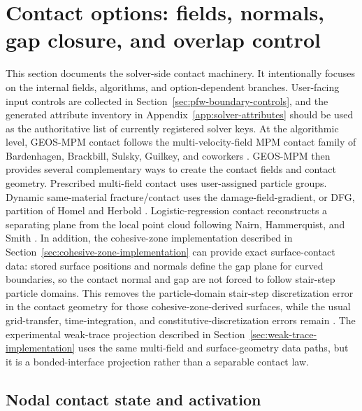 \section{Contact options: fields, normals, gap closure, and overlap control}
\label{sec:contact-surface-detection-spacing}
\label{sec:contact-options}

This section documents the solver-side contact machinery.  It intentionally focuses on the internal fields, algorithms, and option-dependent branches.  User-facing input controls are collected in Section~\ref{sec:pfw-boundary-controls}, and the generated attribute inventory in Appendix~\ref{app:solver-attributes} should be used as the authoritative list of currently registered solver keys.  At the algorithmic level, GEOS-MPM contact follows the multi-velocity-field MPM contact family of Bardenhagen, Brackbill, Sulsky, Guilkey, and coworkers \cite{bardenhagen2000granular,bardenhagen2001contact}.  GEOS-MPM then provides several complementary ways to create the contact fields and contact geometry.  Prescribed multi-field contact uses user-assigned particle groups.  Dynamic same-material fracture/contact uses the damage-field-gradient, or DFG, partition of Homel and Herbold \cite{homel2016dfg}.  Logistic-regression contact reconstructs a separating plane from the local point cloud following Nairn, Hammerquist, and Smith \cite{nairn2020contact}.  In addition, the cohesive-zone implementation described in Section~\ref{sec:cohesive-zone-implementation} can provide exact surface-contact data: stored surface positions and normals define the gap plane for curved boundaries, so the contact normal and gap are not forced to follow stair-step particle domains.  This removes the particle-domain stair-step discretization error in the contact geometry for those cohesive-zone-derived surfaces, while the usual grid-transfer, time-integration, and constitutive-discretization errors remain \cite{crook2025cohesive}.  The experimental weak-trace projection described in Section~\ref{sec:weak-trace-implementation} uses the same multi-field and surface-geometry data paths, but it is a bonded-interface projection rather than a separable contact law.

\subsection{Nodal contact state and activation}
\label{subsec:contact-state-activation}

